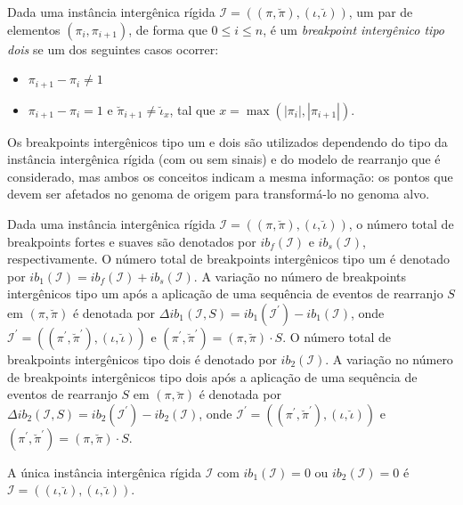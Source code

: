 \begin{definition}
  Dada uma instância intergênica rígida $\mathcal{I} = ((\pi,\breve\pi),(\iota,\breve\iota))$, um par de elementos $(\pi_{i}, \pi_{i+1})$, de forma que $0 \le i \le n$, é um \emph{breakpoint intergênico tipo dois} se um dos seguintes casos ocorrer:
  \begin{itemize}
    \item $\pi_{i+1} - \pi_{i} \ne 1$
    \item $\pi_{i+1} - \pi_{i} = 1$ e $\breve\pi_{i+1} \ne \breve\iota_{x}$, tal que $x = \max(|\pi_{i}|, |\pi_{i+1}|)$.
  \end{itemize}
\end{definition}

Os breakpoints intergênicos tipo um e dois são utilizados dependendo do tipo da instância intergênica rígida (com ou sem sinais) e do modelo de rearranjo que é considerado, mas ambos os conceitos indicam a mesma informação: os pontos que devem ser afetados no genoma de origem para transformá-lo no genoma alvo.

Dada uma instância intergênica rígida $\mathcal{I} = ((\pi,\breve\pi),(\iota,\breve\iota))$, o número total de breakpoints fortes e suaves são denotados por $ib_f(\mathcal{I})$ e $ib_s(\mathcal{I})$, respectivamente. O número total de breakpoints intergênicos tipo um é denotado por $ib_{1}(\mathcal{I}) = ib_f(\mathcal{I}) + ib_s(\mathcal{I})$. A variação no número de breakpoints intergênicos tipo um após a aplicação de uma sequência de eventos de rearranjo $S$ em $(\pi,\breve\pi)$ é denotada por  $\Delta ib_1(\mathcal{I},S) = ib_1(\mathcal{I}^{\prime}) - ib_1(\mathcal{I})$, onde $\mathcal{I}^{\prime} = ((\pi^{\prime}, \breve\pi^{\prime}),(\iota,\breve\iota))$ e $(\pi^{\prime}, \breve\pi^{\prime}) = (\pi, \breve\pi) \cdot S$. O número total de breakpoints intergênicos tipo dois é denotado por $ib_{2}(\mathcal{I})$. A variação no número de breakpoints intergênicos tipo dois após a aplicação de uma sequência de eventos de rearranjo $S$ em $(\pi,\breve\pi)$ é denotada por  $\Delta ib_2(\mathcal{I},S) = ib_2(\mathcal{I}^{\prime}) - ib_2(\mathcal{I})$, onde $\mathcal{I}^{\prime} = ((\pi^{\prime}, \breve\pi^{\prime}),(\iota,\breve\iota))$ e $(\pi^{\prime}, \breve\pi^{\prime}) = (\pi, \breve\pi) \cdot S$.

\begin{remark}\label{remark:UDYJTHAH}
  A única instância intergênica rígida $\mathcal{I}$ com $ib_1(\mathcal{I}) = 0$ ou $ib_2(\mathcal{I}) = 0$ é $\mathcal{I} = ((\iota,\breve\iota),(\iota,\breve\iota))$.
\end{remark}


